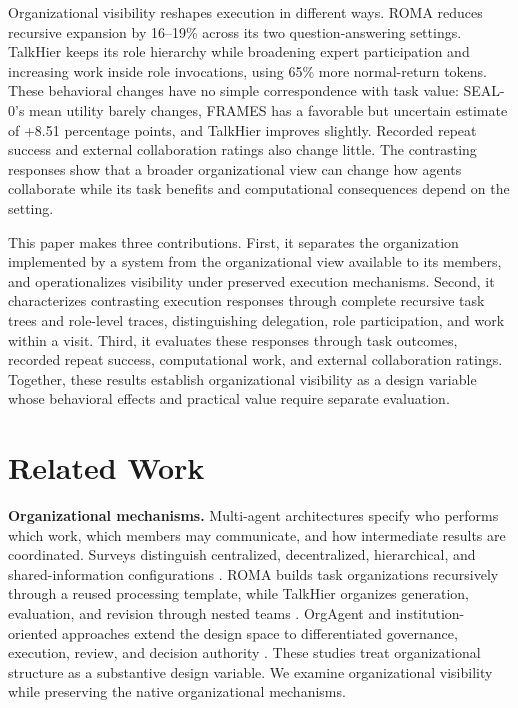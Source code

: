 \documentclass[10pt,letterpaper,twocolumn]{article}
\begin{document}
Organizational vis\-i\-bil\-i\-ty reshapes ex\-e\-cu\-tion in dif\-fer\-ent ways. ROMA reduces re\-cur\-sive ex\-pan\-sion by 16--19\% across its two ques\-tion-an\-swer\-ing settings. TalkHier keeps its role hierarchy while broadening expert participation and increasing work inside role invocations, using 65\% more normal-return tokens. These behavioral changes have no simple correspondence with task value: SEAL-0's mean utility barely changes, FRAMES has a favorable but un\-cer\-tain estimate of +8.51 percentage points, and TalkHier improves slightly. Recorded repeat success and external col\-lab\-o\-ra\-tion ratings also change little. The contrasting responses show that a broad\-er or\-ga\-ni\-za\-tion\-al view can change how agents collaborate while its task benefits and com\-pu\-ta\-tion\-al con\-se\-quences depend on the setting.

This paper makes three contributions. First, it separates the or\-ga\-ni\-za\-tion implemented by a sys\-tem from the or\-ga\-ni\-za\-tion\-al view available to its members, and operationalizes vis\-i\-bil\-i\-ty under preserved ex\-e\-cu\-tion mech\-a\-nisms. Second, it characterizes contrasting ex\-e\-cu\-tion responses through complete re\-cur\-sive task trees and role-level traces, distinguishing del\-e\-ga\-tion, role par\-tic\-i\-pa\-tion, and work within a visit. Third, it eval\-u\-ates these responses through task out\-comes, re\-cord\-ed repeat success, com\-pu\-ta\-tion\-al work, and external col\-lab\-o\-ra\-tion ratings. Together, these results establish or\-ga\-ni\-za\-tion\-al vis\-i\-bil\-i\-ty as a design variable whose behavioral effects and practical value require separate evaluation.

\section{Related Work}
\textbf{Organizational mech\-a\-nisms.} Multi-agent ar\-chi\-tec\-tures specify who performs which work, which members may communicate, and how intermediate results are coordinated. Surveys distinguish centralized, decentralized, hierarchical, and shared-in\-for\-ma\-tion configurations \cite{massurvey}. ROMA builds task or\-ga\-ni\-za\-tions recursively through a reused processing template, while TalkHier organizes generation, evaluation, and revision through nested teams \cite{roma,talkhier}. OrgAgent and institution-oriented approaches extend the design space to differentiated governance, ex\-e\-cu\-tion, review, and decision authority \cite{orgagent,institutions}. These studies treat or\-ga\-ni\-za\-tion\-al structure as a substantive design variable. We examine or\-ga\-ni\-za\-tion\-al vis\-i\-bil\-i\-ty while preserving the na\-tive or\-ga\-ni\-za\-tion\-al mech\-a\-nisms.
\end{document}
